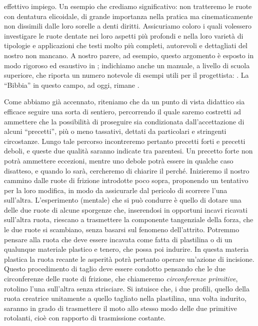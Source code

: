 effettivo impiego. Un esempio che crediamo significativo:
non tratteremo le ruote con dentatura elicoidale, di grande importanza
nella pratica ma cinematicamente non dissimili dalle loro sorelle
a denti diritti.
Assicuriamo coloro i quali volessero
investigare le ruote dentate nei loro
aspetti pi\`u profondi e nella loro variet\`a di tipologie e applicazioni
che testi molto pi\`u completi, autorevoli e dettagliati
del nostro non mancano. A nostro parere, ad esempio,
questo argomento \`e esposto in modo rigoroso ed esaustivo in
\cite{pellicano}; indichiamo anche un manuale, a livello di scuola superiore,
che riporta un numero notevole di esempi utili per 
il progettista: \cite{punzi}. La ``Bibbia'' in questo campo, ad oggi, rimane \cite{henriot}.

\noindent Come abbiamo gi\`a accennato, riteniamo che
da un punto di vista didattico
sia efficace seguire una sorta di sentiero, percorrendo il quale
saremo costretti ad ammettere
che la possibilit\`a di proseguire sia condizionata dall'accettazione
di alcuni ``precetti'', pi\`u o meno tassativi, dettati da particolari
e stringenti circostanze.
Lungo tale percorso incontreremo pertanto
precetti forti e precetti deboli, e queste due qualit\`a saranno indicate tra
parentesi. Un precetto forte non potr\`a ammettere eccezioni, mentre uno
debole potr\`a essere in qualche caso disatteso, e quando lo sar\`a,
cercheremo di chiarire il perch\'e.
Inizieremo il nostro cammino dalle
ruote di frizione introdotte poco sopra, proponendo
un tentativo per la loro modifica,
in modo da assicurarle dal pericolo di
scorrere l'una sull'altra.
L'esperimento (mentale) che si pu\`o condurre \`e quello
di dotare una delle due ruote di alcune sporgenze che, inserendosi
in opportuni incavi ricavati sull'altra ruota, riescano a trasmettere
la componente tangenziale della forza, che le due ruote si scambiano,
senza basarsi sul fenomeno dell'attrito. Potremmo 
pensare alla ruota che deve essere incavata come fatta di plastilina
o di un qualunque materiale plastico e tenero, che possa poi indurire.
In questa materia plastica la ruota recante le asperit\`a potr\`a
pertanto operare un'azione
di incisione. Questo procedimento di taglio deve essere
condotto pensando che le due circonferenze delle ruote di frizione, 
che chiameremo {\em circonferenze primitive},
rotolino l'una sull'altra senza strisciare. Si intuisce che,
i due profili, quello della ruota creatrice
unitamente a quello tagliato nella plastilina,
una volta indurito, saranno
in grado di trasmettere il moto allo stesso modo delle due primitive
rotolanti, cio\`e con rapporto di trasmissione
costante.


